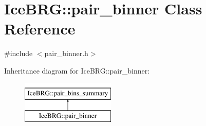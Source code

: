 \hypertarget{classIceBRG_1_1pair__binner}{\section{Ice\-B\-R\-G\-:\-:pair\-\_\-binner Class Reference}
\label{classIceBRG_1_1pair__binner}
}


{\ttfamily \#include $<$pair\-\_\-binner.\-h$>$}

Inheritance diagram for Ice\-B\-R\-G\-:\-:pair\-\_\-binner\-:\begin{figure}[H]
\begin{center}
\leavevmode
\includegraphics[height=2.000000cm]{classIceBRG_1_1pair__binner}
\end{center}
\end{figure}
